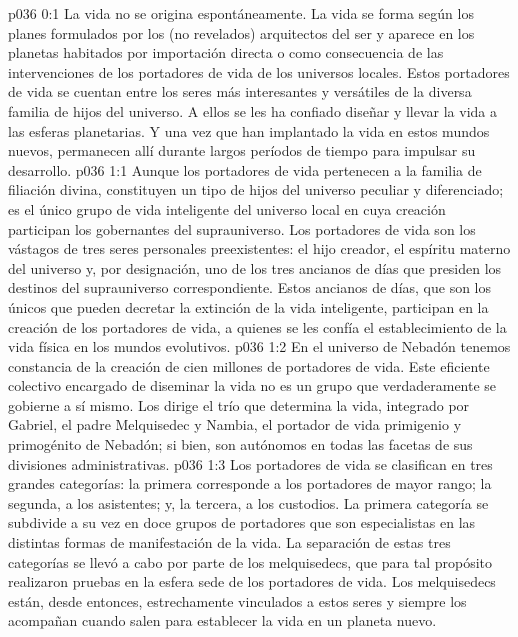 \author{Hijo vorondadec}
\vs p036 0:1 La vida no se origina espontáneamente. La vida se forma según los planes formulados por los (no revelados) arquitectos del ser y aparece en los planetas habitados por importación directa o como consecuencia de las intervenciones de los portadores de vida de los universos locales. Estos portadores de vida se cuentan entre los seres más interesantes y versátiles de la diversa familia de hijos del universo. A ellos se les ha confiado diseñar y llevar la vida a las esferas planetarias. Y una vez que han implantado la vida en estos mundos nuevos, permanecen allí durante largos períodos de tiempo para impulsar su desarrollo.
\vs p036 1:1 Aunque los portadores de vida pertenecen a la familia de filiación divina, constituyen un tipo de hijos del universo peculiar y diferenciado; es el único grupo de vida inteligente del universo local en cuya creación participan los gobernantes del suprauniverso. Los portadores de vida son los vástagos de tres seres personales preexistentes: el hijo creador, el espíritu materno del universo y, por designación, uno de los tres ancianos de días que presiden los destinos del suprauniverso correspondiente. Estos ancianos de días, que son los únicos que pueden decretar la extinción de la vida inteligente, participan en la creación de los portadores de vida, a quienes se les confía el establecimiento de la vida física en los mundos evolutivos.
\vs p036 1:2 En el universo de Nebadón tenemos constancia de la creación de cien millones de portadores de vida. Este eficiente colectivo encargado de diseminar la vida no es un grupo que verdaderamente se gobierne a sí mismo. Los dirige el trío que determina la vida, integrado por Gabriel, el padre Melquisedec y Nambia, el portador de vida primigenio y primogénito de Nebadón; si bien, son autónomos en todas las facetas de sus divisiones administrativas.
\vs p036 1:3 Los portadores de vida se clasifican en tres grandes categorías: la primera corresponde a los portadores de mayor rango; la segunda, a los asistentes; y, la tercera, a los custodios. La primera categoría se subdivide a su vez en doce grupos de portadores que son especialistas en las distintas formas de manifestación de la vida. La separación de estas tres categorías se llevó a cabo por parte de los melquisedecs, que para tal propósito realizaron pruebas en la esfera sede de los portadores de vida. Los melquisedecs están, desde entonces, estrechamente vinculados a estos seres y siempre los acompañan cuando salen para establecer la vida en un planeta nuevo.
